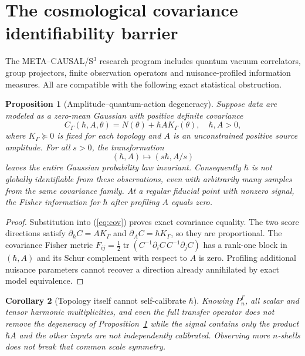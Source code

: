 \documentclass[11pt,a4paper]{article}
\newtheorem{proposition}{Proposition}[section]
\newtheorem{corollary}[proposition]{Corollary}
\newcommand{\h}{\hbar}
\newcommand{\tr}{\operatorname{tr}}
\begin{document}
\section{The cosmological covariance identifiability barrier}
The META--CAUSAL/S$^3$ research program includes quantum vacuum correlators, group projectors, finite observation operators and nuisance-profiled information measures. All are compatible with the following exact statistical obstruction.
\begin{proposition}[Amplitude--quantum-action degeneracy]\label{pr:degeneracy}
Suppose data are modeled as a zero-mean Gaussian with positive definite covariance
\begin{equation}\label{eq:cov}
 C_\Gamma(\h,A,\theta)=N(\theta)+\h A K_\Gamma(\theta),\quad \h,A>0,
\end{equation}
where $K_\Gamma\succeq0$ is fixed for each topology and $A$ is an unconstrained positive source amplitude. For all $s>0$, the transformation
\begin{equation}\label{eq:gauge}
 (\h,A)\mapsto(s\h,A/s)
\end{equation}
leaves the entire Gaussian probability law invariant. Consequently $\h$ is not globally identifiable from these observations, even with arbitrarily many samples from the same covariance family. At a regular fiducial point with nonzero signal, the Fisher information for $\h$ after profiling $A$ equals zero.
\end{proposition}
\begin{proof} Substitution into (\ref{eq:cov}) proves exact covariance equality. The two score directions satisfy $\partial_{\h}C=A K_\Gamma$ and $\partial_A C=\h K_\Gamma$, so they are proportional. The covariance Fisher metric $F_{ij}=\frac12\tr(C^{-1}\partial_i C\,C^{-1}\partial_j C)$ has a rank-one block in $(\h,A)$ and its Schur complement with respect to $A$ is zero. Profiling additional nuisance parameters cannot recover a direction already annihilated by exact model equivalence.\end{proof}
\begin{corollary}[Topology itself cannot self-calibrate $\h$]
Knowing $P_n^\Gamma$, all scalar and tensor harmonic multiplicities, and even the full transfer operator does not remove the degeneracy of Proposition~\ref{pr:degeneracy} while the signal contains only the product $\h A$ and the other inputs are not independently calibrated. Observing more $n$-shells does not break that \emph{common} scale symmetry.
\end{corollary}
\end{document}
